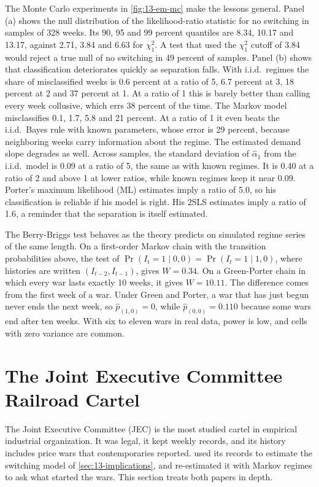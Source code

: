 The Monte Carlo experiments in \cref{fig:13-em-mc} make the lessons general. Panel (a) shows the null distribution
of the likelihood-ratio statistic for no switching in samples of 328 weeks. Its 90, 95 and 99 percent quantiles are
8.34, 10.17 and 13.17, against 2.71, 3.84 and 6.63 for $\chi^2_1$. A test that used the $\chi^2_1$ cutoff of 3.84
would reject a true null of no switching in 49 percent of samples. Panel (b) shows that classification deteriorates
quickly as separation falls. With i.i.d.\ regimes the share of misclassified weeks is 0.6 percent at a ratio of 5,
6.7 percent at 3, 18 percent at 2 and 37 percent at 1. At a ratio of 1 this is barely better than calling every week
collusive, which errs 38 percent of the time. The Markov model misclassifies 0.1, 1.7, 5.8 and 21 percent. At a ratio
of 1 it even beats the i.i.d.\ Bayes rule with known parameters, whose error is 29 percent, because neighboring weeks
carry information about the regime. The estimated demand slope degrades as well. Across samples, the standard
deviation of $\hat\alpha_1$ from the i.i.d.\ model is 0.09 at a ratio of 5, the same as with known regimes. It is 0.40
at a ratio of 2 and above 1 at lower ratios, while known regimes keep it near 0.09. Porter's maximum likelihood (ML) estimates imply a
ratio of 5.0, so his classification is reliable if his model is right. His 2SLS estimates imply a ratio of 1.6, a
reminder that the separation is itself estimated.

The Berry-Briggs test behaves as the theory predicts on simulated regime series of the same length. On a
first-order Markov chain with the transition probabilities above, the test of $\Pr(I_t = 1\mid 0, 0) =
\Pr(I_t = 1 \mid 1, 0)$, where histories are written $(I_{t-2}, I_{t-1})$, gives $W = 0.34$. On a Green-Porter
chain in which every war lasts exactly 10 weeks, it gives $W = 10.11$. The difference comes from the first week of
a war. Under Green and Porter, a war that has just begun never ends the next week, so $\hat p_{(1,0)} = 0$, while
$\hat p_{(0,0)} = 0.110$ because some wars end after ten weeks. With six to eleven wars in real data, power is low,
and cells with zero variance are common.

\section{The Joint Executive Committee Railroad Cartel}\label{sec:13-jec}

The Joint Executive Committee (JEC) is the most studied cartel in empirical industrial organization. It was legal,
it kept weekly records, and its history includes price wars that contemporaries reported.  used
its records to estimate the switching model of \cref{sec:13-implications}, and \citet{Ellison1994} re-estimated it
with Markov regimes to ask what started the wars. This section treats both papers in depth.


